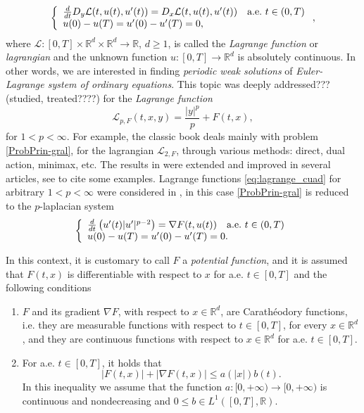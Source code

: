 \documentclass[twoside]{article}
\makeatletter
\theoremstyle{remark}
\newcommand{\labitem}[2]{%
\def\@itemlabel{\textbf{#1}}
\item
\def\@currentlabel{#1}\label{#2}}
\newcommand{\rr}{\mathbb{R}}
\renewcommand{\leq}{\leqslant}
\renewcommand{\geq}{\geqslant}
\newcounter{example}
\makeatother
\begin{document}
\begin{equation}\label{ProbPrin-gral}
    \left\{%
\begin{array}{ll}
  \frac{d}{dt} D_{y}\mathcal{L}(t,u(t),u'(t))= D_{x}\mathcal{L}(t,u(t),u'(t)) \quad \hbox{a.e.}\ t \in (0,T)\\
    u(0)-u(T)=u'(0)-u'(T)=0,
\end{array}%
\right.,
\end{equation}
where $\mathcal{L}:[0,T]\times\rr^d\times\rr^d\to\rr$, $d\geq 1$, is called the \emph{Lagrange function} or \emph{lagrangian} and the unknown function  $u:[0,T]\to\rr^d$ is absolutely continuous. In other words, we are interested in  finding \emph{periodic weak solutions} of \emph{Euler-Lagrange system of ordinary equations}. This topic was deeply addressed???(studied, treated????) for the \emph{Lagrange function}
\begin{equation}\label{eq:lagrange_cuad}
\mathcal{L}_{p,F}(t,x,y)=\frac{|y|^p}{p}+F(t,x),
\end{equation}
for $1<p<\infty$. For example, the classic book  \cite{mawhin2010critical} deals mainly with problem \eqref{ProbPrin-gral}, for the lagrangian $\mathcal{L}_{2,F}$, through various methods: direct, dual action, minimax, etc. The results in \cite{mawhin2010critical} were extended and improved in several articles, see  \cite{tang1995periodic,tang1998periodic,wu1999periodic,tang2001periodic,zhao2004periodic}  to cite some examples. Lagrange functions \eqref{eq:lagrange_cuad} for arbitrary $1<p<\infty$ were considered in  \cite{Tian2007192,tang2010periodic}, in this case \eqref{ProbPrin-gral}  is reduced to the $p$-laplacian system
\begin{equation}\label{ProbP-lapla}
    \left\{%
\begin{array}{ll}
   \frac{d}{dt}\left(u'(t)|u'|^{p-2}\right) = \nabla F(t,u(t)) \quad \hbox{a.e.}\ t \in (0,T)\\
    u(0)-u(T)=u'(0)-u'(T)=0.
\end{array}%
\right.
\end{equation}


In this context, it  is customary to call $F$ a  \emph{potential function}, and it is assumed that $F(t,x)$ is differentiable with respect to $x$ for a.e. $t\in [0,T]$ and the following conditions
\begin{enumerate}
\labitem{(C)}{item:condicion_c} $F$ and its gradient $\nabla F$, with respect to $x\in\rr^d$,  are  Carath\'eodory functions, i.e. they are measurable functions with respect to $t\in [0,T]$, for every  $x\in\rr^d$, and they are continuous functions with  respect to  $x\in\rr^d$ for a.e. $t \in [0,T]$.
 \labitem{(A)}{item:condicion_a}  For   a.e. $t\in [0,T]$, it holds that
\begin{equation}
|F(t,x)| + |\nabla F(t,x)|  \leq a(|x|)b(t).
\end{equation}
In this inequality we assume that the function  $a:[0,+\infty)\to [0,+\infty)$ is continuous and nondecreasing and $0\leq b\in L^1([0,T],\rr)$.
\end{enumerate}
\end{document}
